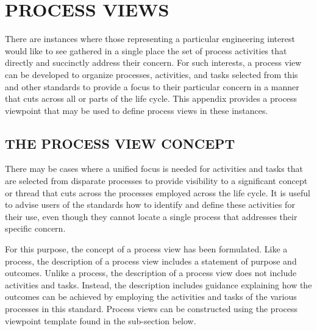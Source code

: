 
\section{PROCESS VIEWS\label{llsec:process_views}}
\begin{adjustwidth}{0em}{0pt}

	There are instances where those representing a particular engineering interest would like to see gathered in a single place the set of process activities that directly and succinctly address their concern. For such interests, a process view can be developed to organize processes, activities, and tasks selected from this and other standards to provide a focus to their particular concern in a manner that cuts across all or parts of the life cycle. This appendix provides a process viewpoint that may be used to define process views in these instances.

\end{adjustwidth}
		

	\subsection{THE PROCESS VIEW CONCEPT\label{subsec:process_view_concept}}
	\begin{adjustwidth}{0.5em}{0pt}

		There may be cases where a unified focus is needed for activities and tasks that are selected from disparate processes to provide visibility to a significant concept or thread that cuts across the processes employed across the life cycle. It is useful to advise users of the standards how to identify and define these activities for their use, even though they cannot locate a single process that addresses their specific concern.

		For this purpose, the concept of a process view has been formulated. Like a process, the description of a process view includes a statement of purpose and outcomes. Unlike a process, the description of a process view does not include activities and tasks. Instead, the description includes guidance explaining how the outcomes can be achieved by employing the activities and tasks of the various processes in this standard. Process views can be constructed using the process viewpoint template found in the  sub-section below.

	\end{adjustwidth}


